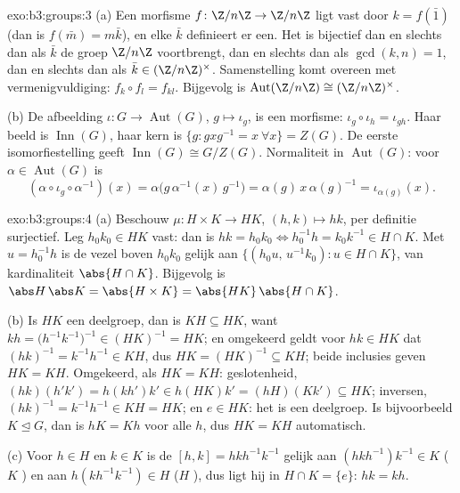 \begin{solution}{exo:b3:groups:3}
(a) Een morfisme $f \colon \Z/n\Z \to \Z/n\Z$ ligt vast door $k =
f(\bar 1)$ (dan is $f(\bar m) = m\bar k$), en elke $\bar k$
definieert er een. Het is bijectief dan en slechts dan als $\bar k$
de groep $\Z/n\Z$ voortbrengt, dan en slechts dan als $\gcd(k,n) =
1$, dan en slechts dan als $\bar k \in (\Z/n\Z)^\times$.
Samenstelling komt overeen met vermenigvuldiging: $f_k \circ f_l =
f_{kl}$. Bijgevolg is $\operatorname{Aut}(\Z/n\Z) \cong
(\Z/n\Z)^\times$.

(b) De afbeelding $\iota\colon G \to \operatorname{Aut}(G)$, $g
\mapsto \iota_g$, is een morfisme: $\iota_g \circ \iota_h =
\iota_{gh}$. Haar beeld is $\operatorname{Inn}(G)$, haar kern is
$\{g : gxg^{-1} = x\ \forall x\} = Z(G)$. De eerste
isomorfiestelling geeft $\operatorname{Inn}(G) \cong G/Z(G)$.
Normaliteit in $\operatorname{Aut}(G)$: voor $\alpha \in
\operatorname{Aut}(G)$ is
\[
(\alpha \circ \iota_g \circ \alpha^{-1})(x)
= \alpha\bigl(g\,\alpha^{-1}(x)\,g^{-1}\bigr)
= \alpha(g)\, x\, \alpha(g)^{-1} = \iota_{\alpha(g)}(x).
\]
\end{solution}

\begin{solution}{exo:b3:groups:4}
(a) Beschouw $\mu \colon H \times K \to HK$, $(h,k) \mapsto hk$,
per definitie surjectief. Leg $h_0k_0 \in HK$ vast: dan is $hk =
h_0k_0 \iff h_0^{-1}h = k_0 k^{-1} \in H \cap K$. Met $u =
h_0^{-1}h$ is de vezel boven $h_0k_0$ gelijk aan $\{(h_0u,\,
u^{-1}k_0) : u \in H \cap K\}$, van kardinaliteit $\abs{H \cap K}$.
Bijgevolg is $\abs H\,\abs K = \abs{H\times K} = \abs{HK}\,\abs{H
\cap K}$.

(b) Is $HK$ een deelgroep, dan is $KH \subseteq HK$, want $kh =
\bigl(h^{-1}k^{-1}\bigr)^{-1} \in (HK)^{-1} = HK$; en omgekeerd
geldt voor $hk \in HK$ dat $(hk)^{-1} = k^{-1}h^{-1} \in KH$, dus
$HK = (HK)^{-1} \subseteq KH$; beide inclusies geven $HK = KH$.
Omgekeerd, als $HK = KH$: geslotenheid, $(hk)(h'k') = h(kh')k' \in
h(HK)k' = (hH)(Kk') \subseteq HK$; inversen, $(hk)^{-1} =
k^{-1}h^{-1} \in KH = HK$; en $e \in HK$: het is een deelgroep. Is
bijvoorbeeld $K \trianglelefteq G$, dan is $hK = Kh$ voor alle $h$,
dus $HK = KH$ automatisch.

(c) Voor $h \in H$ en $k \in K$ is de  $[h,k] = hkh^{-1}
k^{-1}$ gelijk aan $(hkh^{-1})k^{-1} \in K$ ($K$ ) en aan
$h(kh^{-1}k^{-1}) \in H$ ($H$ ), dus ligt hij in $H \cap K =
\{e\}$: $hk = kh$.
\end{solution}

